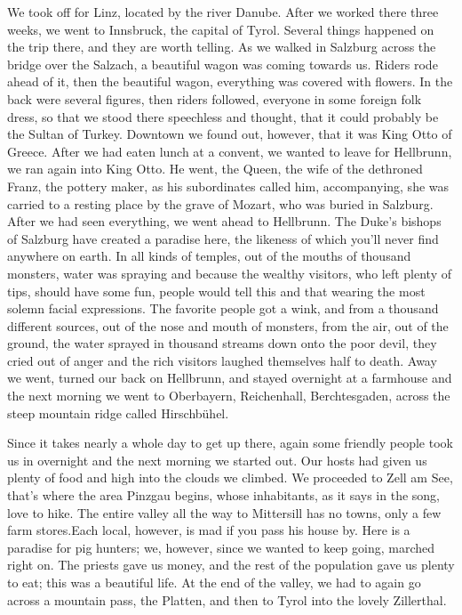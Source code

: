\documentclass{article}
\begin{document}
We took off for Linz, located by the river Danube. After we worked there three weeks, we went to Innsbruck, the capital of Tyrol. Several things happened on the trip there, and they are worth telling. As we walked in Salzburg across the bridge over the Salzach, a beautiful wagon was coming towards us. Riders rode ahead of it, then the beautiful wagon, everything was covered with flowers. In the back were several figures, then riders followed, everyone in some foreign folk dress, so that we stood there speechless and thought, that it could probably be the Sultan of Turkey. Downtown we found out, however, that it was King Otto of Greece. After we had eaten lunch at a convent, we wanted to leave for Hellbrunn, we ran again into King Otto. He went, the Queen, the wife of the dethroned Franz, the pottery maker, as his subordinates called him, accompanying, she was carried to a resting place by the grave of Mozart, who was buried in Salzburg. After we had seen everything, we went ahead to Hellbrunn. The Duke's bishops of Salzburg have created a paradise here, the likeness of which you'll never find anywhere on earth. In all kinds of temples, out of the mouths of thousand monsters, water was spraying and because the wealthy visitors, who left plenty of tips, should have some fun, people would tell this and that wearing the most solemn facial expressions. The favorite people got a wink, and from a thousand different sources, out of the nose and mouth of monsters, from the air, out of the ground, the water sprayed in thousand streams down onto the poor devil, they cried out of anger and the rich visitors laughed themselves half to death. Away we went, turned our back on Hellbrunn, and stayed overnight at a farmhouse and the next morning we went to Oberbayern, Reichenhall, Berchtesgaden, across the steep mountain ridge called Hirschbühel.

Since it takes nearly a whole day to get up there, again some friendly people took us in overnight and the next morning we started out. Our hosts had given us plenty of food and high into the clouds we climbed. We proceeded to Zell am See, that's where the area Pinzgau begins, whose inhabitants, as it says in the song, love to hike. The entire valley all the way to Mittersill has no towns, only a few farm stores.Each local, however, is mad if you pass his house by. Here is a paradise for pig hunters; we, however, since we wanted to keep going, marched right on. The priests gave us money, and the rest of the population gave us plenty to eat; this was a beautiful life. At the end of the valley, we had to again go across a mountain pass, the Platten, and then to Tyrol into the lovely Zillerthal.
\end{document}
